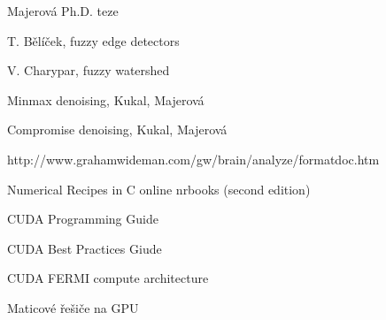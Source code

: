 \begin{thebibliography}{9}
        Majerová Ph.D. teze

        T. Bělíček, fuzzy edge detectors

        V. Charypar, fuzzy watershed

        Minmax denoising, Kukal, Majerová

        Compromise denoising, Kukal, Majerová

        http://www.grahamwideman.com/gw/brain/analyze/formatdoc.htm

        Numerical Recipes in C online nrbooks (second edition)

        CUDA Programming Guide
        
        CUDA Best Practices Giude

        CUDA FERMI compute architecture
    
        Maticové řešiče na GPU

\end{thebibliography} 